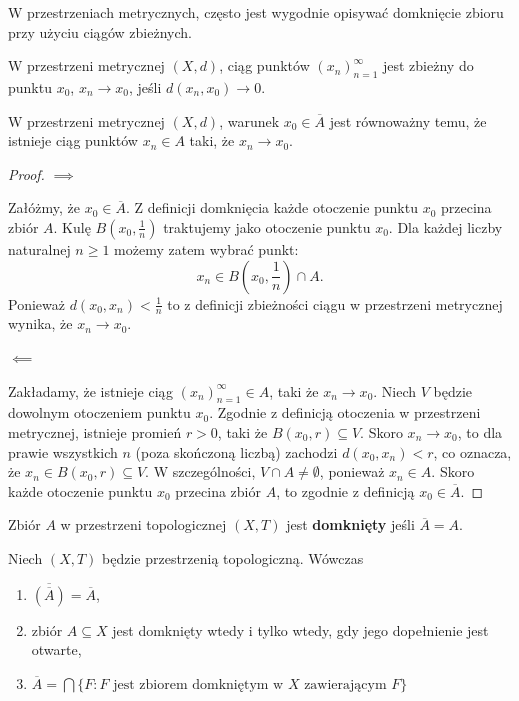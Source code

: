 W przestrzeniach metrycznych, często jest wygodnie opisywać domknięcie zbioru przy użyciu ciągów zbieżnych.

\begin{definition}
	W przestrzeni metrycznej $\left( X,d \right) $, ciąg punktów $\left( x_{n}  \right)_{n=1}^{\infty}$ jest zbieżny do punktu $x_0$, $x_{n} \to x_0$, jeśli $d\left( x_{n} ,x_0 \right) \to 0$.
\end{definition} 
\begin{theorem}[1.2.16]
	W przestrzeni metrycznej $\left( X,d \right) $, warunek $x_0 \in \overline{A}$ jest równoważny temu, że istnieje ciąg punktów $x_{n} \in A$ taki, że $x_{n} \to x_0$.
\end{theorem} 
\begin{proof}
\noindent $\bm{ \implies } $

Załóżmy, że $x_0 \in \overline{A}$. Z definicji domknięcia każde otoczenie punktu $x_0$ przecina zbiór $A$. Kulę $B\left( x_0, \frac{1}{n} \right) $ traktujemy jako otoczenie punktu $x_0$. Dla każdej liczby naturalnej $n\ge 1$ możemy zatem wybrać punkt:
\[
x_{n} \in B\left( x_0,\frac{1}{n} \right) \cap A
.\] 
Ponieważ $d\left( x_0, x_{n}  \right) < \frac{1}{n}$ to z definicji zbieżności ciągu w przestrzeni metrycznej wynika, że $x_{n} \longrightarrow x_0$.

\noindent $\bm{ \impliedby } $

Zakładamy, że istnieje ciąg $\left( x_{n}  \right)_{n=1}^{\infty} \in A$, taki że $x_{n} \longrightarrow x_0$. Niech $V$ będzie dowolnym otoczeniem punktu $x_0$. Zgodnie z definicją otoczenia w przestrzeni metrycznej, istnieje promień $r>0$, taki że $B\left( x_0, r \right) \subseteq V$. Skoro $x_{n} \longrightarrow x_0$, to dla prawie wszystkich $n$ (poza skończoną liczbą) zachodzi $d\left( x_0, x_{n}  \right) < r$, co oznacza, że $x_{n} \in B\left( x_0, r \right) \subseteq V$. W szczególności, $V\cap A\neq \emptyset$, ponieważ $x_{n} \in A$. Skoro każde otoczenie punktu $x_0$ przecina zbiór $A$, to zgodnie z definicją $x_0\in \overline{A}$.
	
\end{proof} 
\begin{definition}
	Zbiór $A$ w przestrzeni topologicznej $\left( X,T \right) $ jest \textbf{domknięty} jeśli $\overline{A} = A$.
\end{definition} 
\begin{theorem}[1.2.18]
	Niech $\left( X,T \right) $ będzie przestrzenią topologiczną. Wówczas
	\begin{enumerate}[label=\arabic*)]
		\item $\overline{\left( \overline{A} \right) } = \overline{A}$,
		\item zbiór $A \subseteq X$ jest domknięty wtedy i tylko wtedy, gdy jego dopełnienie jest otwarte,
		\item $\overline{A} = \bigcap \{F: F \text{ jest zbiorem domkniętym w $X$ zawierającym $F$}\}  $
	\end{enumerate}
\end{theorem} 
